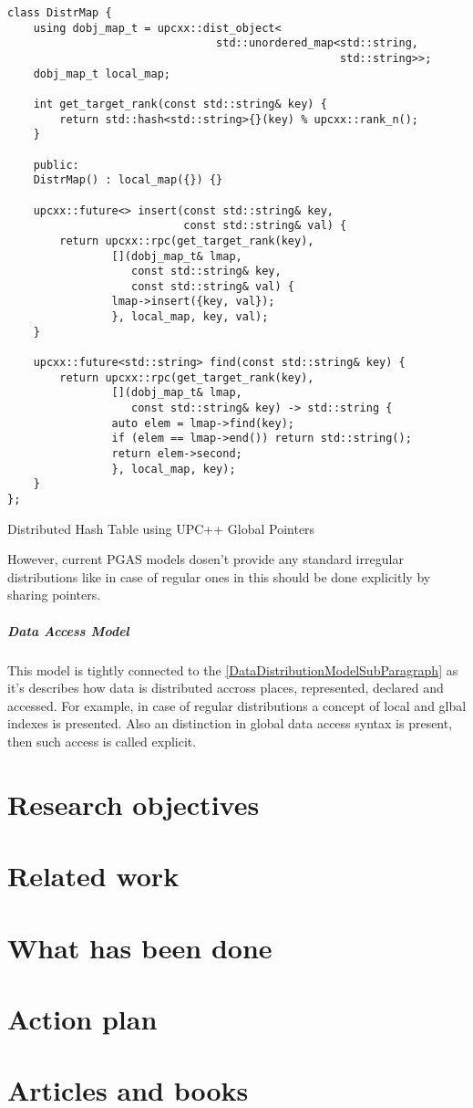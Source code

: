 \documentclass[14pt]{extreport}
\newcommand\blankpage{
    \null
    \thispagestyle{empty}
    \newpage
    }
\begin{document}
\begin{listing}[H]
\begin{verbatim}
class DistrMap {
	using dobj_map_t = upcxx::dist_object<
								std::unordered_map<std::string,	
												   std::string>>;
	dobj_map_t local_map;

	int get_target_rank(const std::string& key) {
		return std::hash<std::string>{}(key) % upcxx::rank_n();
	}

	public:
	DistrMap() : local_map({}) {}

	upcxx::future<> insert(const std::string& key, 
						   const std::string& val) {
		return upcxx::rpc(get_target_rank(key),
				[](dobj_map_t& lmap, 
				   const std::string& key, 
				   const std::string& val) {
				lmap->insert({key, val});
				}, local_map, key, val);
	}

	upcxx::future<std::string> find(const std::string& key) {
		return upcxx::rpc(get_target_rank(key),
				[](dobj_map_t& lmap, 
				   const std::string& key) -> std::string {
				auto elem = lmap->find(key);
				if (elem == lmap->end()) return std::string();
				return elem->second;
				}, local_map, key);
	}
};
\end{verbatim}
\caption{Distributed Hash Table using UPC++ Global Pointers}
\end{listing}

However, current PGAS models dosen't provide any standard irregular distributions like in case of regular ones in this should be done explicitly by sharing pointers.

\blankpage

\subparagraph{Data Access Model}
This model is tightly connected to the \ref{DataDistributionModelSubParagraph} as it's describes how data is distributed accross places, represented, declared and accessed. For example, in case of regular distributions a concept of local and glbal indexes is presented. Also an distinction in global data access syntax is present, then such access is called explicit.

\section{Research objectives}
\blankpage

\section{Related work}
\blankpage

\section{What has been done}
\blankpage

\section{Action plan}
\blankpage

\section{Articles and books}
\end{document}
